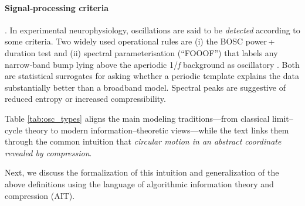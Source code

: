 


\paragraph{Signal‑processing criteria}.
In experimental neurophysiology, oscillations are said to  be  \textit{detected} according to some criteria.  
Two widely used operational rules are  
(i) the BOSC power\,+\,duration test \cite{Whitten11} and  
(ii) spectral parameterisation (``FOOOF'') that labels any narrow‑band bump lying above the aperiodic 1/\emph{f} background as oscillatory \cite{Donoghue20}.  
Both are statistical surrogates for asking whether a periodic template explains the data substantially better than a broadband model. Spectral peaks are suggestive of reduced entropy or increased compressibility.


Table \ref{tab:osc_types} aligns the main modeling traditions—from classical limit–cycle theory to modern information–theoretic views—while the text links them through the common intuition that  \textit{circular motion in an abstract coordinate revealed by compression}.



Next, we discuss the formalization of this intuition and  generalization of the above definitions using the language of algorithmic information theory and compression (AIT)\cite{cover_elements_2006}.



